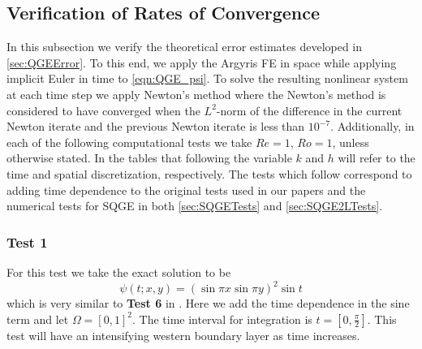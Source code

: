 \subsection{Verification of Rates of Convergence}
In this subsection we verify the theoretical error estimates developed in
\autoref{sec:QGEError}. To this end, we apply the Argyris FE in space while
applying implicit Euler in time to \eqref{eqn:QGE_psi}. To solve the resulting
nonlinear system at each time step we apply Newton's method where the Newton's
method is considered to have converged when the $L^2$-norm of the difference in
the current Newton iterate and the previous Newton iterate is less than
$10^{-7}$. Additionally, in each of the following computational tests we take
$Re = 1$, $Ro = 1$, unless otherwise stated. In the tables that following the
variable $k$ and $h$ will refer to the time and spatial discretization,
respectively. The tests which follow correspond to adding time dependence to the
original tests used in our papers \cite{Foster,Foster2L} and the numerical tests
for SQGE in both \autoref{sec:SQGETests} and \autoref{sec:SQGE2LTests}.

\subsubsection*{Test 1}
For this test we take the exact solution to be
\begin{equation}
  \psi(t;x,y) = \left(\sin \pi x \sin \pi y\right)^2 \sin t
  \label{eqn:Test1}
\end{equation}
which is very similar to \textbf{Test 6} in \cite{Foster}. Here we add the time
dependence in the sine term and let $\Omega = [0,1]^2$. The time interval for
integration is $t = [0,\frac{\pi}{2}]$. This test will have an intensifying
western boundary layer as time increases.

